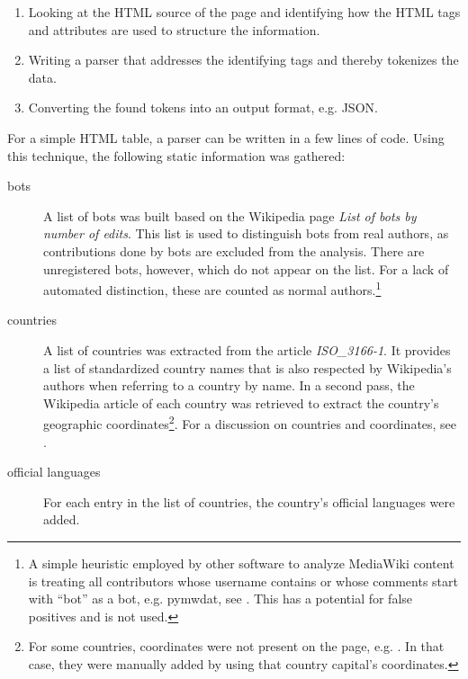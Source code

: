\begin{enumerate}
  \item Looking at the \ac{HTML} source of the page and identifying how the \ac{HTML} tags and attributes are used to structure the information.
  \item Writing a parser that addresses the identifying tags and thereby tokenizes the data.
  \item Converting the found tokens into an output format, e.g. \ac{JSON}.
\end{enumerate}

For a simple \ac{HTML} table, a parser can be written in a few lines of code.
Using this technique, the following static information was gathered:

\begin{description}
\item[bots] A list of bots was built based on the Wikipedia page \emph{List of bots by number of edits}. 
This list is used to distinguish bots from real authors, as contributions done by bots are excluded from the analysis.
There are unregistered bots, however, which do not appear on the list.
For a lack of automated distinction, these are counted as normal authors.\footnote{A simple heuristic employed by other software to analyze MediaWiki content is treating all contributors whose username contains or whose comments start with ``bot'' as a bot, e.g. pymwdat, see . This has a potential for false positives and is not used.}
\item[countries] A list of countries was extracted from the article \emph{ISO\_3166-1}. 
It provides a list of standardized country names that is also respected by Wikipedia's authors when referring to a country by name.
In a second pass, the Wikipedia article of each country was retrieved to extract the country's  geographic coordinates\footnote{For some countries, coordinates were not present on the page, e.g. . In that case, they were manually added by using that country capital's coordinates.}.
For a discussion on countries and coordinates, see .
\item[official languages] For each entry in the list of countries, the country's official languages were added.

\end{description}
